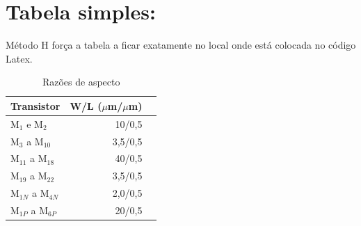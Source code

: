 \section*{Tabela simples:}
Método H for\c{c}a a tabela a ficar exatamente no local onde está colocada no código Latex.
\begin{table}[H]
    \centering
    \caption{Razões de aspecto}
    \label{tab_aspectos}
    \begin{tabular}{|l|r|r|}
    \hline
    Transistor                    & W/L ($\mu$m/$\mu$m) \\ \hline
    M$_1$ e M$_2$                 & 10/0,5              \\ \hline
    M$_3$ a M$_{10}$              & 3,5/0,5             \\ \hline
    M$_{11}$ a M$_{18}$           & 40/0,5              \\ \hline
    M$_{19}$ a M$_{22}$           & 3,5/0,5             \\ \hline
    M$_{1N}$ a M$_{4N}$           & 2,0/0,5             \\ \hline
    M$_{1P}$ a M$_{6P}$           & 20/0,5              \\ \hline
    \end{tabular}
\end{table}
